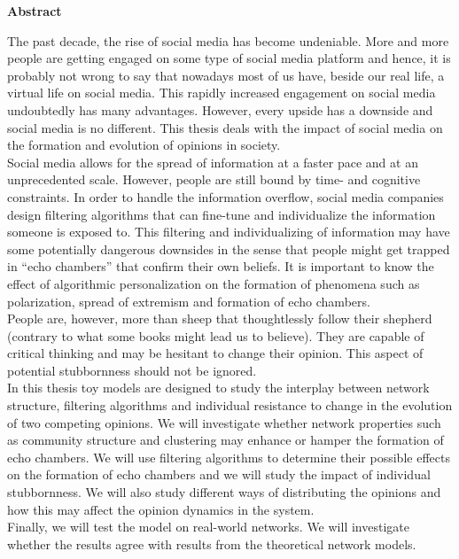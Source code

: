 \documentclass[11 pt , letterpaper , twoside , openright]{book}
\newenvironment{abstract}%
{\cleardoublepage\null \vfill\begin{center}\bfseries \abstractname \end{center}}{\vfill\null}
\begin{document}
\renewcommand{\abstractname}{Abstract}
\begin{abstract}
\thispagestyle{plain}
\setcounter{page}{\value{abstractpage}}

\noindent
The past decade, the rise of social media has become undeniable. More and more people are getting engaged on some type of social media platform and hence, it is probably not wrong to say that nowadays most of us have, beside our real life, a virtual life on social media. This rapidly increased engagement on social media undoubtedly has many advantages. However, every upside has a downside and social media is no different. This thesis deals with the impact of social media on the formation and evolution of opinions in society.\\ 
\newline
Social media allows for the spread of information at a faster pace and at an unprecedented scale. However, people are still bound by time- and cognitive constraints. In order to handle the information overflow, social media companies design filtering algorithms that can fine-tune and individualize the information someone is exposed to. This filtering and individualizing of information may have some potentially dangerous downsides in the sense that people might get trapped in ``echo chambers'' that confirm their own beliefs. It is important to know the effect of algorithmic personalization on the formation of phenomena such as polarization, spread of extremism and formation of echo chambers.\\
\newline
People are, however, more than sheep that thoughtlessly follow their shepherd (contrary to what some books might lead us to believe). They are capable of critical thinking and may be hesitant to change their opinion. This aspect of potential stubbornness should not be ignored.\\
\newline
In this thesis toy models are designed to study the interplay between network structure, filtering algorithms and individual resistance to change in the evolution of two competing opinions. We will investigate whether network properties such as community structure and clustering may enhance or hamper the formation of echo chambers. We will use filtering algorithms to determine their possible effects on the formation of echo chambers and we will study the impact of individual stubbornness. We will also study different ways of distributing the opinions and how this may affect the opinion dynamics in the system. \\
\newline
Finally, we will test the model on real-world networks. We will investigate whether the results agree with results from the theoretical network models.

\setcounter{abstractpage}{\value{page}}
\end{abstract}
\end{document}
